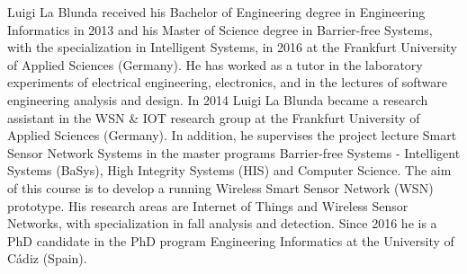 \documentclass[10pt,journal,compsoc]{IEEEtran}
\begin{document}
\begin{IEEEbiography}{Luigi La Blunda}
 received his Bachelor of Engineering degree in Engineering Informatics in 2013 and his Master of Science degree in Barrier-free Systems, with the specialization in Intelligent Systems, in 2016 at the Frankfurt University of Applied Sciences (Germany). He has worked as a tutor in the laboratory experiments of electrical engineering, electronics, and in the lectures of software engineering analysis and design. In 2014 Luigi La Blunda became a research assistant in the WSN \& IOT research group at the Frankfurt University of Applied Sciences (Germany). In addition, he supervises the project lecture Smart Sensor Network Systems in the master programs Barrier-free Systems - Intelligent Systems (BaSys), High Integrity Systems (HIS) and Computer Science. The aim of this course is to develop a running Wireless Smart Sensor Network (WSN) prototype.  His research areas are Internet of Things and Wireless Sensor Networks, with specialization in fall analysis and detection. Since 2016 he is a PhD candidate in the PhD program Engineering Informatics at the University of Cádiz (Spain).
\end{IEEEbiography}

\end{document}
